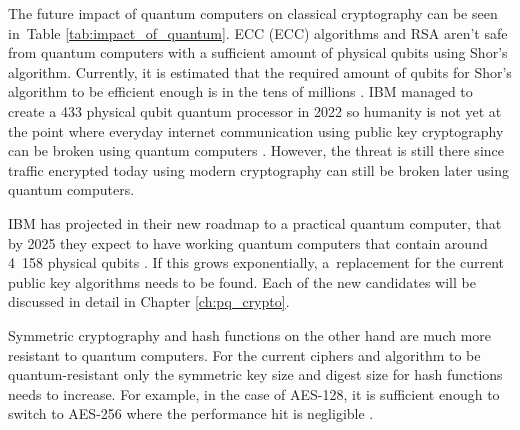 The future impact of quantum computers on classical cryptography can be seen in~Table \ref{tab:impact_of_quantum}. ECC (\acl{ECC}) algorithms and RSA aren't safe from quantum computers with a sufficient amount of physical qubits using Shor's algorithm. Currently, it is estimated that the required amount of qubits for Shor's algorithm to be efficient enough is in the tens of millions \cite{Bernstein149}\cite{Mosca2015}. IBM managed to create a 433 physical qubit quantum processor in 2022 so humanity is not yet at the point where everyday internet communication using public key cryptography can be broken using quantum computers \cite{0MBNdFRCTLK35MFY}. However, the threat is still there since traffic encrypted today using modern cryptography can still be broken later using quantum computers.

IBM has projected in their new roadmap to a practical quantum computer, that by 2025 they expect to have working quantum computers that contain around 4~158 physical qubits \cite{Gambetta2021}. If this grows exponentially, a~replacement for the current public key algorithms needs to be found. Each of the new candidates will be discussed in detail in Chapter \ref{ch:pq_crypto}.

Symmetric cryptography and hash functions on the other hand are much more resistant to quantum computers. For the current ciphers and algorithm to be quantum-resistant only the symmetric key size and digest size for hash functions needs to increase. For example, in the case of AES-128, it is sufficient enough to switch to AES-256 where the performance hit is negligible \cite{Bernstein149}.

